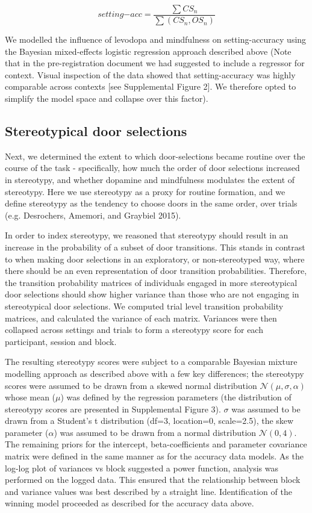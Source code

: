 \documentclass{article}
\begin{document}
\[
setting\mathrm{-}acc = \frac{\sum{CS_{n}}}{\sum{(CS_{n}, OS_{n})}}
\]

We modelled the influence of levodopa and mindfulness on
setting-accuracy using the Bayesian mixed-effects logistic regression
approach described above (Note that in the pre-registration document we
had suggested to include a regressor for context. Visual inspection of
the data showed that setting-accuracy was highly comparable across
contexts {[}see Supplemental Figure 2{]}. We therefore opted to simplify
the model space and collapse over this factor).

\hypertarget{stereotypical-door-selections}{%
\subsection{Stereotypical door
selections}\label{stereotypical-door-selections}}

Next, we determined the extent to which door-selections became routine
over the course of the task - specifically, how much the order of door
selections increased in stereotypy, and whether dopamine and mindfulness
modulates the extent of stereotypy. Here we use stereotypy as a proxy
for routine formation, and we define stereotypy as the tendency to
choose doors in the same order, over trials (e.g. Desrochers, Amemori,
and Graybiel 2015).

In order to index stereotypy, we reasoned that stereotypy should result
in an increase in the probability of a subset of door transitions. This
stands in contrast to when making door selections in an exploratory, or
non-stereotyped way, where there should be an even representation of
door transition probabilities. Therefore, the transition probability
matrices of individuals engaged in more stereotypical door selections
should show higher variance than those who are not engaging in
stereotypical door selections. We computed trial level transition
probability matrices, and calculated the variance of each matrix.
Variances were then collapsed across settings and trials to form a
stereotypy score for each participant, session and block.

The resulting stereotypy scores were subject to a comparable Bayesian
mixture modelling approach as described above with a few key
differences; the stereotypy scores were assumed to be drawn from a
skewed normal distribution \(\mathcal{N}(\mu, \sigma, \alpha)\) whose
mean (\(\mu\)) was defined by the regression parameters (the
distribution of stereotypy scores are presented in Supplemental Figure
3). \(\sigma\) was assumed to be drawn from a Student's t distribution
(df=3, location=0, scale=2.5), the skew parameter (\(\alpha\)) was
assumed to be drawn from a normal distribution \(\mathcal{N}(0,4)\). The
remaining priors for the intercept, beta-coefficients and parameter
covariance matrix were defined in the same manner as for the accuracy
data models. As the log-log plot of variances vs block suggested a power
function, analysis was performed on the logged data. This ensured that
the relationship between block and variance values was best described by
a straight line. Identification of the winning model proceeded as
described for the accuracy data above.
\end{document}
